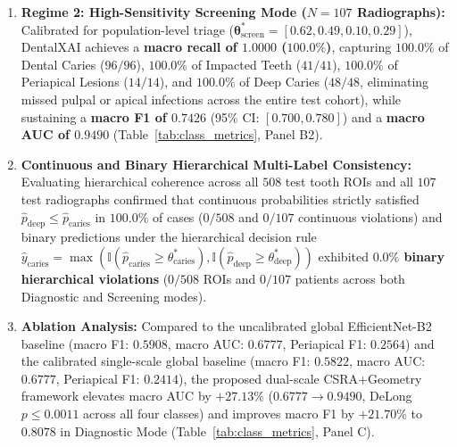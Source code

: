\documentclass[review]{elsarticle}
\begin{document}
\begin{enumerate}
    \item \textbf{Regime 2: High-Sensitivity Screening Mode ($N=107$ Radiographs):} Calibrated for population-level triage ($\boldsymbol{\theta}^*_{\text{screen}} = [0.62, 0.49, 0.10, 0.29]$), DentalXAI achieves a \textbf{macro recall of $1.0000$ ($100.0\%$)}, capturing $100.0\%$ of Dental Caries ($96/96$), $100.0\%$ of Impacted Teeth ($41/41$), $100.0\%$ of Periapical Lesions ($14/14$), and $100.0\%$ of Deep Caries ($48/48$, eliminating missed pulpal or apical infections across the entire test cohort), while sustaining a \textbf{macro F1 of $0.7426$} (95\% CI: $[0.700, 0.780]$) and a \textbf{macro AUC of $0.9490$} (Table~\ref{tab:class_metrics}, Panel B2).
    \item \textbf{Continuous and Binary Hierarchical Multi-Label Consistency:} Evaluating hierarchical coherence across all $508$ test tooth ROIs and all $107$ test radiographs confirmed that continuous probabilities strictly satisfied $\hat{p}_{\text{deep}} \le \hat{p}_{\text{caries}}$ in $100.0\%$ of cases ($0/508$ and $0/107$ continuous violations) and binary predictions under the hierarchical decision rule $\hat{y}_{\text{caries}} = \max(\mathbb{I}(\hat{p}_{\text{caries}} \ge \theta^*_{\text{caries}}), \mathbb{I}(\hat{p}_{\text{deep}} \ge \theta^*_{\text{deep}}))$ exhibited \textbf{$0.0\%$ binary hierarchical violations} ($0/508$ ROIs and $0/107$ patients across both Diagnostic and Screening modes).
    \item \textbf{Ablation Analysis:} Compared to the uncalibrated global EfficientNet-B2 baseline (macro F1: $0.5908$, macro AUC: $0.6777$, Periapical F1: $0.2564$) and the calibrated single-scale global baseline (macro F1: $0.5822$, macro AUC: $0.6777$, Periapical F1: $0.2414$), the proposed dual-scale CSRA+Geometry framework elevates macro AUC by \textbf{$+27.13\%$} ($0.6777 \to 0.9490$, DeLong $p \le 0.0011$ across all four classes) and improves macro F1 by $+21.70\%$ to $0.8078$ in Diagnostic Mode (Table~\ref{tab:class_metrics}, Panel C).
\end{enumerate}
\end{document}
